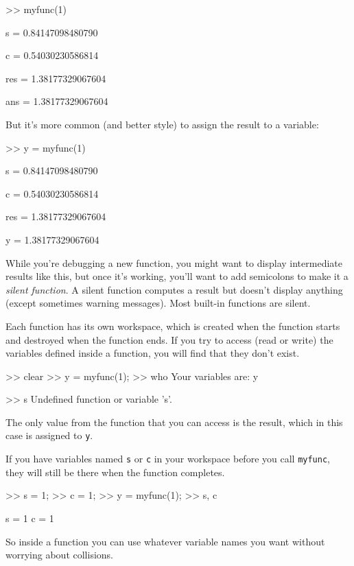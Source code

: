 \begin{code}
>> myfunc(1)

s = 0.84147098480790

c = 0.54030230586814

res = 1.38177329067604

ans = 1.38177329067604
\end{code}

But it's more common (and better style) to assign the result to
a variable:

\begin{code}
>> y = myfunc(1)

s = 0.84147098480790

c = 0.54030230586814

res = 1.38177329067604

y = 1.38177329067604
\end{code}

While you're debugging a new function, you might want to display
intermediate results like this, but once it's working, you'll want
to add semicolons to make it a \emph{silent function}.  A silent function
computes a result but doesn't display
anything (except sometimes warning messages). Most built-in
functions are silent.


Each function has its own workspace, which is created when the
function starts and destroyed when the function ends.  If you try to
access (read or write) the variables defined inside a function, you
will find that they don't exist.

\begin{code}
>> clear
>> y = myfunc(1);
>> who
Your variables are: y

>> s
Undefined function or variable 's'.
\end{code}

The only value from the function that you can access is the result,
which in this case is assigned to \lstinline{y}.

If you have variables named \lstinline{s} or \lstinline{c} in your workspace
before you call \lstinline{myfunc}, they will still be there when the
function completes.

\begin{code}
>> s = 1;
>> c = 1;
>> y = myfunc(1);
>> s, c

s = 1
c = 1
\end{code}

So inside a function you can use whatever variable names you
want without worrying about collisions.

